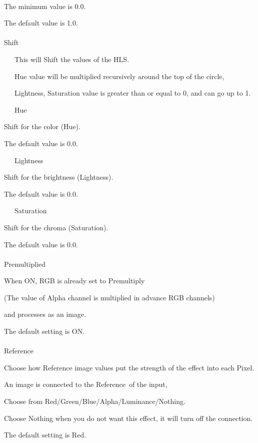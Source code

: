 \documentclass[a4paper,12pt]{article}
\begin{document}
\newpage

\thispagestyle{empty}

\ \vspace{-0.2em}
\par
The minimum value is 0.0.\par
The default value is 1.0.\\
\\
Shift\par
\noindent \ \ \, This will Shift the values of the HLS.\par
\noindent \ \ \, Hue value will be multiplied recursively around the top of the circle,\par
\noindent \ \ \, Lightness, Saturation value is greater than or equal to 0, and can go up to 1.\\
\par
\noindent \ \ \, Hue\par
Shift for the color (Hue).\par
The default value is 0.0.\par
\noindent \ \ \, Lightness\par
Shift for the brightness (Lightness).\par
The default value is 0.0.\par
\noindent \ \ \, Saturation\par
Shift for the chroma (Saturation).\par
The default value is 0.0.\\
\\
Premultiplied\par
When ON, RGB is already set to Premultiply\par
(The value of Alpha channel is multiplied in advance RGB channels)\par
and processes as an image.\par
The default setting is ON.\\
\\
Reference\par
Choose how Reference image values put the strength of the effect into each Pixel.\par
An image is connected to the \textquotedbl Reference\textquotedbl \ of the input,\par
Choose from Red/Green/Blue/Alpha/Luminance/Nothing.\par
Choose Nothing when you do not want this effect, it will turn off the connection.\par
The default setting is Red.
\end{document}
